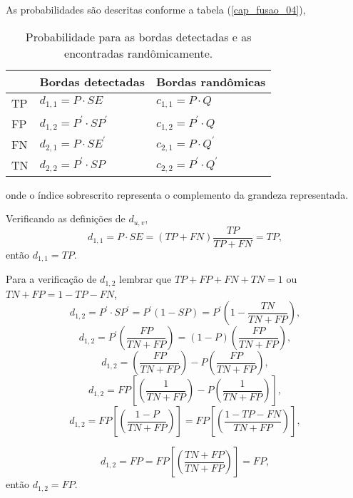 As probabilidades são descritas  conforme a tabela (\ref{cap_fusao_04}), 
\begin{table}[hbt]
	\centering
	\caption{Probabilidade para as bordas detectadas e as encontradas randômicamente.}\label{cap_fusao_tab04}
\begin{tabular}{@{}lll@{}} \toprule
	     & Bordas detectadas  & Bordas randômicas  \\ \midrule
	TP  & $d_{1,1}=P    \cdot SE$     & $c_{1,1}=P    \cdot Q$  \\ 
	FP  & $d_{1,2}=P^{'}\cdot SP^{'}$ & $c_{1,2}=P^{'}\cdot Q$  \\ 
	FN  & $d_{2,1}=P    \cdot SE^{'}$ & $c_{2,1}=P    \cdot Q^{'}$  \\ 
	TN  & $d_{2,2}=P^{'}\cdot SP$     & $c_{2,2}=P^{'}\cdot Q^{'}$  \\ \bottomrule 
\end{tabular}
\end{table}
onde o índice sobrescrito representa o complemento da grandeza representada.

Verificando as definições de $d_{u,v}$,
\begin{equation}\label{cap_fusao_44}
	d_{1,1}=P\cdot SE = (TP + FN)\frac{TP}{TP + FN}=TP,
\end{equation}
então $d_{1,1}= TP$.

Para a verificação de $d_{1,2}$ lembrar que $TP+FP+FN+TN=1$ ou $TN+FP=1-TP-FN$, 
\begin{equation}\nonumber
	d_{1,2}=P^{'}\cdot SP^{'} = P^{'}(1-SP)=P^{'} \left(1-\frac{TN}{TN+FP}\right),
\end{equation}
\begin{equation}\nonumber
	d_{1,2}=P^{'}\left(\frac{FP}{TN+FP}\right)=(1-P)\left(\frac{FP}{TN+FP}\right),
\end{equation}
\begin{equation}\nonumber
	d_{1,2}=\left(\frac{FP}{TN+FP}\right)-P\left(\frac{FP}{TN+FP}\right),
\end{equation}
\begin{equation}\nonumber
	d_{1,2}=FP\left[\left(\frac{1}{TN+FP}\right)-P\left(\frac{1}{TN+FP}\right)\right],
\end{equation}
\begin{equation}\nonumber
	d_{1,2}=FP\left[\left(\frac{1 - P}{TN+FP}\right)\right]=FP\left[\left(\frac{1 - TP - FN}{TN+FP}\right)\right],
\end{equation}
 
\begin{equation}\label{cap_fusao_45}
	d_{1,2}=FP=FP\left[\left(\frac{TN+FP}{TN+FP}\right)\right] = FP,
\end{equation}
então $d_{1,2}= FP$.

